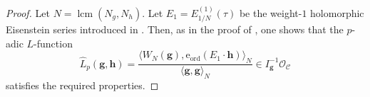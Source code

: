 \documentclass[a4paper,11pt]{amsart}
\theoremstyle{plain}
\newtheorem{theorem}{Theorem}[section]
\theoremstyle{definition}
\theoremstyle{remark}
\newtheorem{remarkwr}[theorem]{Remark}
\newenvironment{remark}{\begin{remarkwr}\begin{upshape}}{\end{upshape}\end{remarkwr}}
\newcommand{\cl}{\mathcal}
\DeclareMathOperator{\lcm}{lcm}
\newcommand{\ord}{{\mathrm{ord}}}
\newcommand{\hg}{{\mathbf{g}}}
\newcommand{\hh}{{\mathbf h}}
\numberwithin{equation}{section}
\begin{document}



\begin{proof}
Let $N=\lcm(N_g,N_h)$. Let $E_1=E^{(1)}_{1/N}(\tau)$ be the weight-$1$ holomorphic Eisenstein series introduced in \cite[\S5.1]{LLZ0}. Then, as in the proof of \cite[Lemma~9.8]{BSV}, one shows that the $p$-adic $L$-function
\[
\widehat{L}_p(\hg,\hh)=\frac{\langle W_{N}(\hg), \mathrm{e}_{\ord}(E_1\cdot \hh)\rangle_N}{\langle \hg,\hg\rangle_N} \in I_{\hg}^{-1} \cl{O}_{\cl{C}}
\]
satisfies the required properties.

\end{proof}
\end{document}
